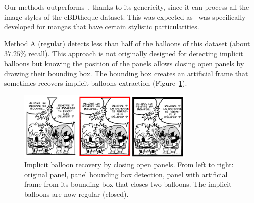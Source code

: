 

Our methods outperforms~\cite{Arai11}, thanks to its genericity, since it can process all the image styles of the eBDtheque dataset.
This was expected as~\cite{Arai11} was specifically developed for mangas that have certain stylistic particularities.

Method A (regular) detects less than half of the balloons of this dataset (about $37.25\%$ recall).
This approach is not originally designed for detecting implicit balloons but knowing the position of the panels allows closing open panels by drawing their bounding box.
The bounding box creates an artificial frame that sometimes recovers implicit balloons extraction (Figure~\ref{fig:ex:implicit_balloon_recovery_by_panel}).

  \begin{figure}[h]  %
    \centering
    \includegraphics[trim= 0px 0px 0px 0px, clip, width=0.75\textwidth]{implicit_balloon_recovery.png}
    \caption[Implicit balloon recovery by closing open panels]{Implicit balloon recovery by closing open panels. From left to right: original panel, panel bounding box detection, panel with artificial frame from its bounding box that closes two balloons. The implicit balloons are now regular (closed).}
    \label{fig:ex:implicit_balloon_recovery_by_panel}
  \end{figure}

